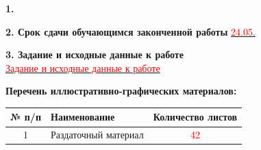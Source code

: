 \documentclass{diploma}
\begin{document}
  \begingroup
  \fontsize{12pt}{14pt}\selectfont
  
  \makeInstituteHeader
  
  \makeAffiliation

  \setlength{\parskip}{.5\baselineskip plus 2pt}

  \makeHeadOfDepartmentSignature


  \makeStudentLine


  \textbf{1.} \makeThemeLine
  
  \textbf{2. Срок сдачи обучающимся законченной работы} \uline{\textcolor{red}{24.05.\the\year} \hfill}

  \textbf{3. Задание и исходные данные к работе}\\
  \uline{
    \textcolor{red}{Задание и исходные данные к работе}
  \hfill}

  \textbf{Перечень иллюстративно-графических материалов:}
  \vspace{\parskip}
  \begin{table}
    \fontsize{12pt}{14pt}\selectfont
    \begin{tabularx}{\textwidth}{|c|X|c|}\hline
    \textbf{№ п/п} & \centering\textbf{Наименование} & \textbf{Количество листов} \\ \hline
    1 & Раздаточный материал & \textcolor{red}{42} \\ \hline
    \end{tabularx}
  \end{table}
  
  \vfill\clearpage
\end{document}
